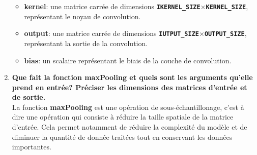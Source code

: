 \documentclass[a4paper, 12pt, openany]{book}
\begin{document}
\begin{enumerate}
{\begin{itemize}
      \item \textbf{kernel}: une matrice carrée de dimensions \textbf{\lstinline{IKERNEL_SIZE}}$\times$\textbf{\lstinline{KERNEL_SIZE}}, représentant le noyau de convolution.
      \item \textbf{output}: une matrice carrée de dimensions \textbf{\lstinline{IUTPUT_SIZE}}$\times$\textbf{\lstinline{OUTPUT_SIZE}}, représentant la sortie de la convolution.
      \item \textbf{bias}: un scalaire représentant le biais de la couche de convolution. \\
    \end{itemize}
  }
  \item {
    \textbf{Que fait la fonction maxPooling et quels sont les arguments qu'elle prend en entrée? Préciser les dimensions des matrices d'entrée et de sortie.} \vspace{0.2cm}\\
    La fonction \textbf{maxPooling} est une opération de sous-échantillonage, c'est à dire une opération qui consiste à réduire la taille spatiale de la matrice d'entrée.
    Cela permet notamment de réduire la complexité du modèle et de diminuer la quantité de donnée traitées tout en conservant les données importantes.

}
\end{enumerate}
\end{document}
